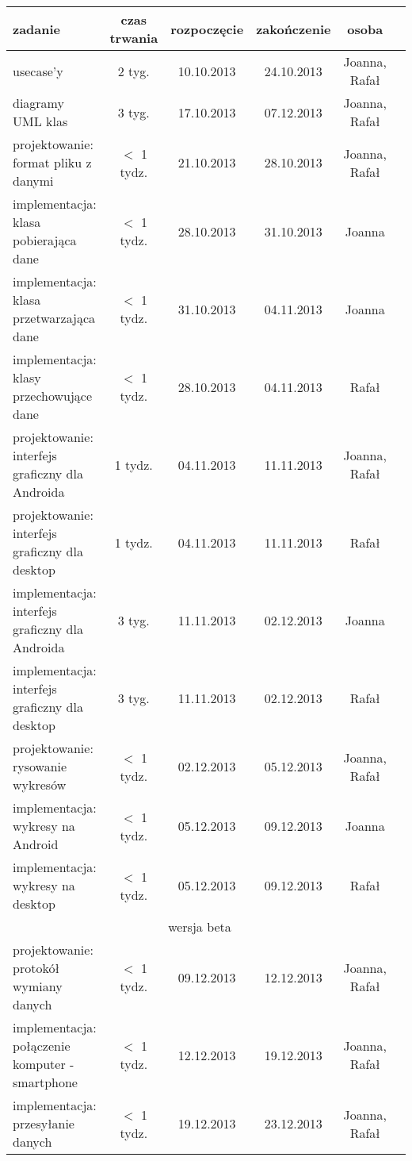 \begin{table}[H]
\centering
\label{harmonogram}
    \begin{tabular}{|p{5cm}|c|c|c|c|c|}
    \hline
        \textbf{zadanie} & \textbf{czas trwania} & \textbf{rozpoczęcie} & \textbf{zakończenie} & \textbf{osoba}\\
    \hline
        usecase'y & 2 tyg. & 10.10.2013 & 24.10.2013 & Joanna, Rafał\\
        diagramy UML klas & 3 tyg. & 17.10.2013 & 07.12.2013 & Joanna, Rafał\\
    \hline
        projektowanie: format pliku z danymi & $<$ 1 tydz. & 21.10.2013 & 28.10.2013 & Joanna, Rafał\\
        implementacja: klasa pobierająca dane & $<$ 1 tydz. & 28.10.2013 & 31.10.2013 & Joanna\\
        implementacja: klasa przetwarzająca dane & $<$ 1 tydz. & 31.10.2013 & 04.11.2013 & Joanna\\
        implementacja: klasy przechowujące dane & $<$ 1 tydz. & 28.10.2013 & 04.11.2013 & Rafał\\
    \hline
        projektowanie: interfejs graficzny dla Androida & 1 tydz. & 04.11.2013 & 11.11.2013 & Joanna, Rafał\\
        projektowanie: interfejs graficzny dla desktop & 1 tydz. & 04.11.2013 & 11.11.2013 & Rafał\\
        implementacja: interfejs graficzny dla Androida & 3 tyg. & 11.11.2013 & 02.12.2013 & Joanna\\
        implementacja: interfejs graficzny dla desktop & 3 tyg. & 11.11.2013 & 02.12.2013 & Rafał\\
    \hline
        projektowanie: rysowanie wykresów & $<$ 1 tydz. & 02.12.2013 & 05.12.2013 & Joanna, Rafał\\
        implementacja: wykresy na Android & $<$ 1 tydz. & 05.12.2013 & 09.12.2013 & Joanna\\
        implementacja: wykresy na desktop & $<$ 1 tydz. & 05.12.2013 & 09.12.2013 & Rafał\\
    \hline
        \multicolumn{5}{|c|}{wersja beta}\\
    \hline
        projektowanie: protokół wymiany danych & $<$ 1 tydz. & 09.12.2013 & 12.12.2013 & Joanna, Rafał\\
        implementacja: połączenie komputer - smartphone & $<$ 1 tydz. & 12.12.2013 & 19.12.2013 & Joanna, Rafał\\
        implementacja: przesyłanie danych & $<$ 1 tydz. & 19.12.2013 & 23.12.2013 & Joanna, Rafał\\
    \hline
    \end{tabular}
\end{table}

